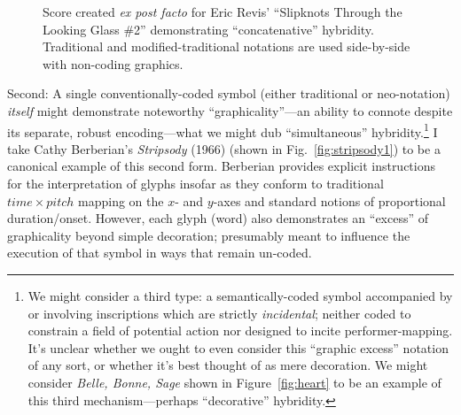         \begin{figure} 
            \centering
            \captionsetup{width=.5\textwidth}
            \caption[Score created \textit{ex post facto} for Eric Revis' ``Slipknots Through the Looking Glass \#2'' demonstrating ``concatenative'' hybridity. Traditional and modified-traditional notations are used side-by-side with non-coding graphics.]{Score created \textit{ex post facto} for Eric Revis' ``Slipknots Through the Looking Glass \#2'' demonstrating ``concatenative'' hybridity. Traditional and modified-traditional notations are used side-by-side with non-coding graphics.\footnotemark}
            \label{fig:revis}
        \end{figure}

    Second: A single conventionally-coded symbol (either traditional or neo-notation) \textit{itself} might demonstrate noteworthy ``graphicality''---an ability to connote despite its separate, robust encoding---what we might dub ``simultaneous'' hybridity.\footnote{We might consider a third type: a semantically-coded symbol accompanied by or involving inscriptions which are strictly \textit{incidental}; neither coded to constrain a field of potential action nor designed to incite performer-mapping. It's unclear whether we ought to even consider this ``graphic excess'' notation of any sort, or whether it's best thought of as mere decoration. We might consider \textit{Belle, Bonne, Sage} shown in Figure~\ref{fig:heart} to be an example of this third mechanism---perhaps ``decorative'' hybridity.} I take Cathy Berberian's \textit{Stripsody} (1966) (shown in Fig.~\ref{fig:stripsody1}) to be a canonical example of this second form. Berberian provides explicit instructions for the interpretation of glyphs insofar as they conform to traditional ${time}\times{pitch}$ mapping on the $x$- and $y$-axes and standard notions of proportional duration/onset. However, each glyph (word) also demonstrates an ``excess'' of graphicality beyond simple decoration; presumably meant to influence the execution of that symbol in ways that remain un-coded. 

